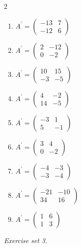 \begin{multicols}{2}
\begin{enumerate}[label=\arabic*., leftmargin=*, itemsep=1pt]
\item $A^{\prime}=\left(\begin{smallmatrix}-13 & 7\\ -12 & 6\end{smallmatrix}\right)$
\item $A^{\prime}=\left(\begin{smallmatrix}2 & -12\\ 0 & -2\end{smallmatrix}\right)$
\item $A^{\prime}=\left(\begin{smallmatrix}10 & 15\\ -3 & -5\end{smallmatrix}\right)$
\item $A^{\prime}=\left(\begin{smallmatrix}4 & -2\\ 14 & -5\end{smallmatrix}\right)$
\item $A^{\prime}=\left(\begin{smallmatrix}-3 & 1\\ 5 & -1\end{smallmatrix}\right)$
\item $A^{\prime}=\left(\begin{smallmatrix}3 & 4\\ 0 & -2\end{smallmatrix}\right)$
\item $A^{\prime}=\left(\begin{smallmatrix}-4 & -3\\ -3 & -4\end{smallmatrix}\right)$
\item $A^{\prime}=\left(\begin{smallmatrix}-21 & -10\\ 34 & 16\end{smallmatrix}\right)$
\item $A^{\prime}=\left(\begin{smallmatrix}1 & 6\\ 1 & 3\end{smallmatrix}\right)$
\end{enumerate}
\end{multicols}
\par\noindent\emph{Exercise set 3.}\nopagebreak
